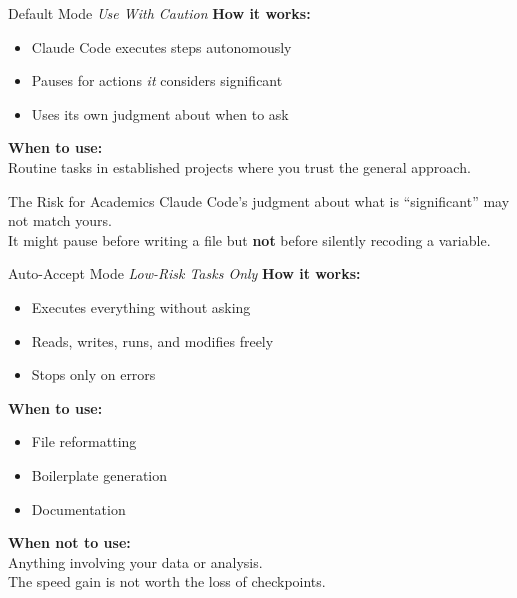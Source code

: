 \documentclass[aspectratio=169, 11pt]{beamer}
\begin{document}
\begin{frame}{Default Mode \hfill \normalsize\textit{Use With Caution}}
  \textbf{How it works:}
  \begin{itemize}
    \item Claude Code executes steps autonomously
    \item Pauses for actions \textit{it} considers significant
    \item Uses its own judgment about when to ask
  \end{itemize}

  \vspace{0.5em}
  \textbf{When to use:}\\
  Routine tasks in established projects where you trust the general approach.

  \vspace{0.8em}
  \begin{alertblock}{The Risk for Academics}
    Claude Code's judgment about what is ``significant'' may not match yours.\\
    It might pause before writing a file but \textbf{not} before silently recoding a variable.
  \end{alertblock}
\end{frame}

\begin{frame}{Auto-Accept Mode \hfill \normalsize\textit{Low-Risk Tasks Only}}
  \textbf{How it works:}
  \begin{itemize}
    \item Executes everything without asking
    \item Reads, writes, runs, and modifies freely
    \item Stops only on errors
  \end{itemize}

  \vspace{0.5em}
  \textbf{When to use:}
  \begin{itemize}
    \item File reformatting
    \item Boilerplate generation
    \item Documentation
  \end{itemize}

  \vspace{0.5em}
  \textbf{When \alert{not} to use:}\\
  Anything involving your data or analysis.\\
  The speed gain is not worth the loss of checkpoints.
\end{frame}
\end{document}
